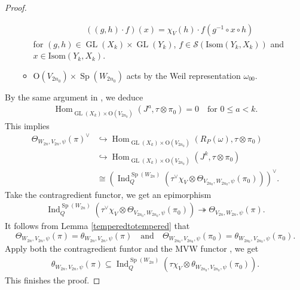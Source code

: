 \documentclass[article]{article}
\numberwithin{equation}{section}
\theoremstyle{definition}
\DeclareMathOperator{\Hom}{Hom}
\DeclareMathOperator{\Ind}{Ind}
\DeclareMathOperator{\GL}{GL}
\DeclareMathOperator{\SP}{Sp}
\begin{document}
\begin{proof}
\begin{itemize}
\begin{itemize}
\begin{align*}
			\left((g,h)\cdot f\right)(x)=\chi_{V}(h)\cdot f(g^{-1}\circ x\circ h)
			\end{align*} 
			for $(g,h)\in \GL(X_k)\times \GL(Y_k)$, $f\in \mathscr S(\mathrm{Isom}(Y_k,X_k))$ and $x\in \mathrm{Isom}(Y_k,X_k)$. 
			\item $\mathrm O(V_{2n_0})\times \SP(W_{2n_0})$ acts by the Weil representation $\omega_{00}$. 
		\end{itemize}
	\end{itemize}
	By the same argument in \cite[Lemma C.4]{MR3166215}, we deduce 
	\begin{align*}
	\Hom_{\GL(X_k)\times \mathrm O(V_{2n_0})}(J^a, \tau\otimes \pi_0)=0\quad \mbox{for $0\leq a<k$}. 
	\end{align*}
	This implies 
	\begin{align*}
	\Theta_{W_{2n},V_{2n},\psi}(\pi)^\vee & \hookrightarrow \Hom_{\GL(X_k)\times \mathrm O(V_{2n_0})}(R_{P}(\omega), \tau\otimes \pi_0)\\
	& \hookrightarrow \Hom_{\GL(X_k)\times \mathrm O(V_{2n_0})}(J^k, \tau\otimes \pi_0)\\
	&\cong \left(\Ind_{Q}^{\SP(W_{2n})} (\tau^\vee\chi_{V}\otimes \Theta_{V_{2n_0},W_{2n_0},\psi}(\pi_{0}))\right)^\vee. 
	\end{align*}
	Take the contragredient functor, we get an epimorphism 
	\begin{align*}
	\Ind_{Q}^{\SP(W_{2n})} (\tau^\vee\chi_{V}\otimes \Theta_{V_{2n_0},W_{2n_0},\psi}(\pi_{0}))\twoheadrightarrow \Theta_{V_{2n},W_{2n},\psi}(\pi). 
	\end{align*} 
	It follows from Lemma \ref{temperedtotempered} that $$\Theta_{W_{2n},V_{2n},\psi}(\pi)=\theta_{W_{2n},V_{2n},\psi}(\pi)\quad\mbox{and}\quad    \Theta_{W_{2n_0},V_{2n_0},\psi}(\pi_0)=\theta_{W_{2n_0},V_{2n_0},\psi}(\pi_0).$$ 
	Apply both the contragredient funtor and the MVW functor \cite[Lemma 2.2]{MR3714507}, we get 
	\begin{align*}
	\theta_{W_{2n},V_{2n},\psi}(\pi)\subseteq \Ind_{Q}^{\SP(W_{2n})} (\tau\chi_{V}\otimes \theta_{W_{2n_0}, V_{2n_0},\psi}(\pi_0)). 
	\end{align*}
	This finishes the proof. 
\end{proof}
\end{document}
